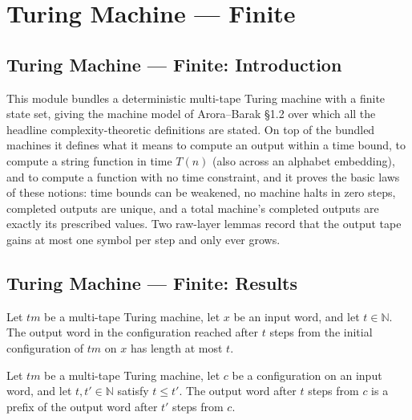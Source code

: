 \section{Turing Machine --- Finite}
\subsection*{Turing Machine --- Finite: Introduction}

This module bundles a deterministic multi-tape Turing machine with a finite
state set, giving the machine model of Arora--Barak \S 1.2 over which all the
headline complexity-theoretic definitions are stated.  On top of the bundled
machines it defines what it means to compute an output within a time bound, to
compute a string function in time $T(n)$ (also across an alphabet embedding),
and to compute a function with no time constraint, and it proves the basic
laws of these notions: time bounds can be weakened, no machine halts in zero
steps, completed outputs are unique, and a total machine's completed outputs
are exactly its prescribed values.  Two raw-layer lemmas record that the
output tape gains at most one symbol per step and only ever grows.

\subsection*{Turing Machine --- Finite: Results}

\begin{theorem}
\label{Turing.MultiTapeTM.output_length_le}
\leanok
{}
Let $tm$ be a multi-tape Turing machine, let $x$ be an input word, and let
$t\in\mathbb{N}$. The output word in the configuration reached after $t$ steps from
the initial configuration of $tm$ on $x$ has length at most $t$.
\end{theorem}

\begin{theorem}
\label{Turing.MultiTapeTM.output_prefix}
\leanok
{}
Let $tm$ be a multi-tape Turing machine, let $c$ be a configuration on an input word,
and let $t,t'\in\mathbb{N}$ satisfy $t\le t'$. The output word after $t$ steps from
$c$ is a prefix of the output word after $t'$ steps from $c$.
\end{theorem}

